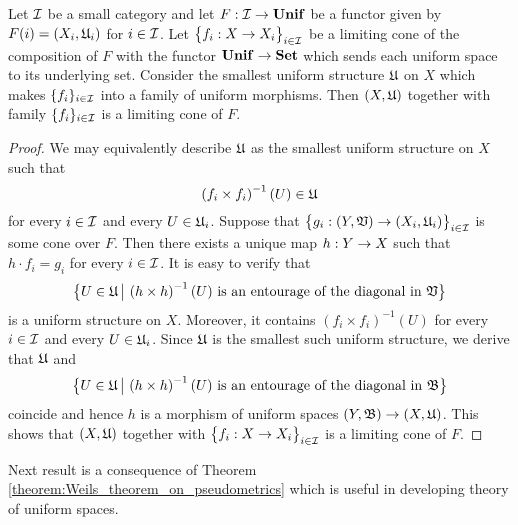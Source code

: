 \begin{theorem}\label{theorem:limits_of_uniform_spaces_description}
Let ${\mathcal I}$ be a small category and let $F:{\mathcal I}\rightarrow \mathbf{Unif}$ be a functor given by $F(i) = (X_i,{\mathfrak U}_i)$ for $i\in {\mathcal I}$. Let $\big\{f_i:X \rightarrow X_i \big\}_{i\in {\mathcal I}}$ be a limiting cone of the composition of $F$ with the functor $\mathbf{Unif} \rightarrow \mathbf{Set}$ which sends each uniform space to its underlying set. Consider the smallest uniform structure ${\mathfrak U}$ on $X$ which makes $\{f_i\}_{i\in {\mathcal I}}$ into a family of uniform morphisms. Then $(X,{\mathfrak U})$ together with family $\{f_i\}_{i\in {\mathcal I}}$ is a limiting cone of $F$.
\end{theorem}
\begin{proof}
We may equivalently describe ${\mathfrak U}$ as the smallest uniform structure on $X$ such that 
$$\left(f_i\times f_i\right)^{-1}(U) \in {\mathfrak U}$$
for every $i\in {\mathcal I}$ and every $U \in {\mathfrak U}_i$. Suppose that $\big\{g_i:(Y,{\mathfrak V}) \rightarrow (X_i,{\mathfrak U}_i)\big\}_{i\in {\mathcal I}}$ is some cone over $F$. Then there exists a unique map $h:Y \rightarrow X$ such that $h\cdot f_i = g_i$ for every $i\in {\mathcal I}$. It is easy to verify that
$$\big\{U\in {\mathfrak U}\,\big|\,\left(h\times h\right)^{-1}(U)\mbox{ is an entourage of the diagonal in }{\mathfrak V}\big\}$$
is a uniform structure on $X$. Moreover, it contains $\left(f_i\times f_i\right)^{-1}(U)$ for every $i\in {\mathcal I}$ and every $U \in {\mathfrak U}_i$. Since ${\mathfrak U}$ is the smallest such uniform structure, we derive that ${\mathfrak U}$ and
$$\big\{U\in {\mathfrak U}\,\big|\,\left(h\times h\right)^{-1}(U)\mbox{ is an entourage of the diagonal in }{\mathfrak B}\big\}$$
coincide and hence $h$ is a morphism of uniform spaces $\left(Y,{\mathfrak B}\right) \rightarrow \left(X,{\mathfrak U}\right)$. This shows that $(X,{\mathfrak U})$ together with $\big\{f_i:X \rightarrow X_i\big\}_{i\in {\mathcal I}}$ is a limiting cone of $F$.
\end{proof}
\noindent
Next result is a consequence of Theorem \ref{theorem:Weils_theorem_on_pseudometrics} which is useful in developing theory of uniform spaces.

